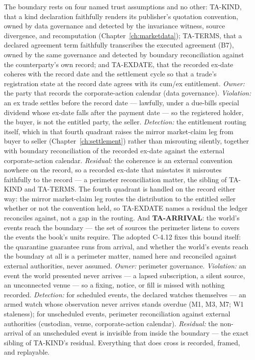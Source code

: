 \documentclass[11pt,a4paper]{article}
\begin{document}
The boundary rests on four named trust assumptions and no other: TA-KIND, that a kind
declaration faithfully renders its publisher's quotation convention, owned by data
governance and detected by the invariance witness, source divergence, and recomputation
(Chapter~\ref{ch:marketdata}); TA-TERMS, that a declared agreement term faithfully
transcribes the executed agreement (B7), owned by the same governance and detected by
boundary reconciliation against the counterparty's own record; and TA-EXDATE, that the
recorded ex-date coheres with the record date and the settlement cycle so that a trade's
registration state at the record date agrees with its cum/ex entitlement. \emph{Owner:}
the party that records the corporate-action calendar (data governance). \emph{Violation:}
an ex trade settles before the record date --- lawfully, under a due-bills special dividend
whose ex-date falls after the payment date --- so the registered holder, the buyer, is not
the entitled party, the seller. \emph{Detection:} the entitlement routing itself, which in
that fourth quadrant raises the mirror market-claim leg from buyer to seller
(Chapter~\ref{ch:settlement}) rather than misrouting silently, together with boundary
reconciliation of the recorded ex-date against the external corporate-action calendar.
\emph{Residual:} the coherence is an external convention nowhere on the record, so a
recorded ex-date that misstates it misroutes faithfully to the record --- a perimeter
reconciliation matter, the sibling of TA-KIND and TA-TERMS. The fourth quadrant is handled
on the record either way: the mirror market-claim leg routes the distribution to the
entitled seller whether or not the convention held, so TA-EXDATE names a residual the
ledger reconciles against, not a gap in the routing. And \textbf{TA-ARRIVAL}: the world's
events reach the boundary --- the set of sources the perimeter listens to covers the
events the book's units require. The adopted C-4.12 fixes this bound itself: the
quarantine guarantee runs from arrival, and whether the world's events reach the boundary
at all is a perimeter matter, named here and reconciled against external authorities,
never assumed. \emph{Owner:} perimeter governance. \emph{Violation:} an event the world
presented never arrives --- a lapsed subscription, a silent source, an unconnected venue
--- so a fixing, notice, or fill is missed with nothing recorded. \emph{Detection:} for
scheduled events, the declared watches themselves --- an armed watch whose observation
never arrives stands overdue (M1, M3, M7; W1 staleness); for unscheduled events, perimeter
reconciliation against external authorities (custodian, venue, corporate-action calendar).
\emph{Residual:} the non-arrival of an unscheduled event is invisible from inside the
boundary --- the exact sibling of TA-KIND's residual. Everything that does cross is
recorded, framed, and replayable.
\end{document}
